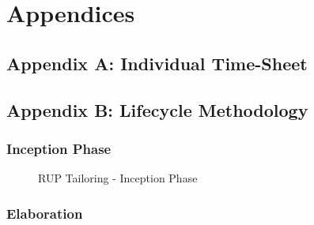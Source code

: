 \documentclass[12pt]{article} %
\begin{document}
	\newpage
	
	\section{Appendices}
	
	\subsection{Appendix A: Individual Time-Sheet}
	
	\newpage
		
	\subsection{Appendix B: Lifecycle Methodology}
	
	\subsubsection{Inception Phase}
	
			\begin{figure}[H] %
				\caption{RUP Tailoring - Inception Phase}
				\label{fig:speciation}
			\end{figure}
			
	\newpage
	
	\subsubsection{Elaboration}
	
\end{document}
